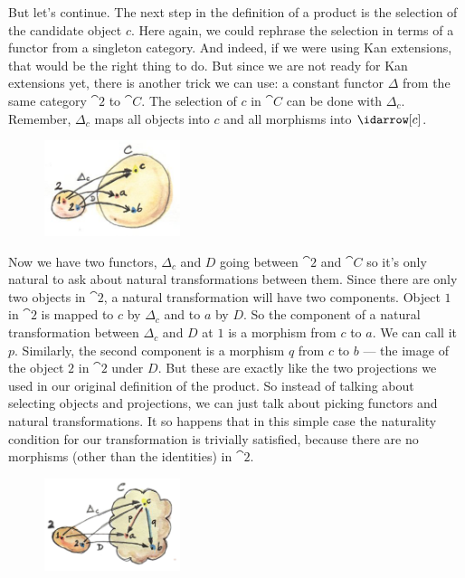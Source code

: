 But let's continue. The next step in the definition of a product is the
selection of the candidate object $c$. Here again, we could
rephrase the selection in terms of a functor from a singleton category.
And indeed, if we were using Kan extensions, that would be the right
thing to do. But since we are not ready for Kan extensions yet, there is
another trick we can use: a constant functor $\Delta$ from the same category
$\cat{2}$ to $\cat{C}$. The selection of $c$ in $\cat{C}$ can be
done with $\Delta_c$. Remember, $\Delta_c$ maps all
objects into $c$ and all morphisms into $\idarrow[c]$.

\begin{figure}[H]
\centering
\includegraphics[width=1.56250in]{images/twodelta.jpg}
\end{figure}

\noindent
Now we have two functors, $\Delta_c$ and $D$ going between
$\cat{2}$ and $\cat{C}$ so it's only natural to ask about natural
transformations between them. Since there are only two objects in
$\cat{2}$, a natural transformation will have two components. Object $1$
in $\cat{2}$ is mapped to $c$ by $\Delta_c$ and to
$a$ by $D$. So the component of a natural transformation between
$\Delta_c$ and $D$ at $1$ is a morphism from $c$ to
$a$. We can call it $p$. Similarly, the second component
is a morphism $q$ from $c$ to $b$ --- the image of
the object $2$ in $\cat{2}$ under $D$. But these are exactly like the two
projections we used in our original definition of the product. So
instead of talking about selecting objects and projections, we can just
talk about picking functors and natural transformations. It so happens
that in this simple case the naturality condition for our transformation
is trivially satisfied, because there are no morphisms (other than the
identities) in $\cat{2}$.

\begin{figure}[H]
\centering
\includegraphics[width=1.56250in]{images/productcone.jpg}
\end{figure}

